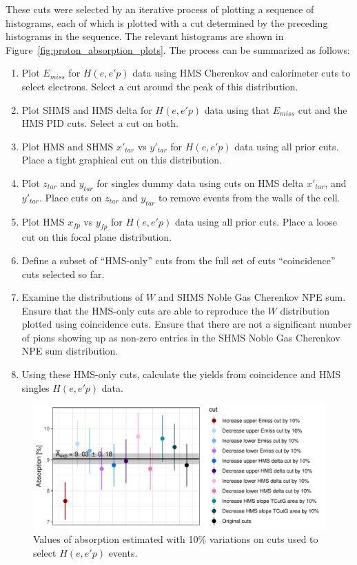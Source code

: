 These cuts were selected by an iterative process of plotting a sequence of
histograms, each of which is plotted with a cut determined by the preceding
histograms in the sequence.
The relevant histograms are shown in Figure~\ref{fig:proton_absorption_plots}.
The process can be summarized as follows:
\begin{enumerate}
    \item Plot $E_{miss}$ for $H(e,e'p)$ data using HMS Cherenkov and calorimeter cuts to select
        electrons. Select a cut around the peak of this distribution.
    \item Plot SHMS and HMS delta for $H(e,e'p)$ data using that $E_{miss}$ cut and the HMS PID
        cuts. Select a cut on both.
    \item Plot HMS and SHMS $x'_{tar}$ vs $y'_{tar}$ for $H(e,e'p)$ data using all prior cuts. Place
        a tight graphical cut on this distribution.
    \item Plot $z_{tar}$ and $y_{tar}$ for singles dummy data using cuts on HMS delta
        $x'_{tar}$, and $y'_{tar}$. Place cuts on $z_{tar}$ and $y_{tar}$ to
        remove events from the walls of the cell.
    \item Plot HMS $x_{fp}$ vs $y_{fp}$ for $H(e,e'p)$ data using all prior cuts.
        Place a loose cut on this focal plane distribution.
    \item Define a subset of ``HMS-only'' cuts from the full set of cuts
        ``coincidence'' cuts selected so far.
    \item Examine the distributions of $W$ and SHMS Noble Gas Cherenkov NPE sum.
        Ensure that the HMS-only cuts are able to reproduce the $W$ distribution
        plotted using coincidence cuts. Ensure that there are not a significant
        number of pions showing up as non-zero entries in the SHMS Noble Gas
        Cherenkov NPE sum distribution.
    \item Using these HMS-only cuts, calculate the yields from coincidence and
        HMS singles $H(e,e'p)$ data.
\end{enumerate}


\begin{figure}[!h]
    \centering
    \includegraphics[width=1.0\textwidth]{chap4/proton_absorption_cut_study.pdf}
    \caption{Values of absorption estimated with 10\% variations on cuts used
             to select $H(e,e'p)$ events.}
    \label{fig:proton_absorption_cut_study}
\end{figure}

